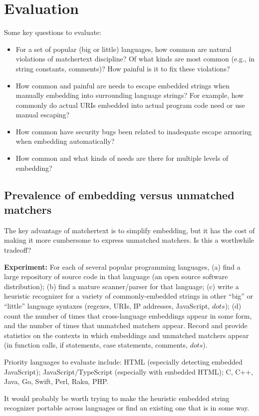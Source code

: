 \section{Evaluation}
\label{sec:eval}

Some key questions to evaluate:
\begin{itemize}
\item	For a set of popular (big or little) languages,
	how common are natural violations of matchertext discipline?
	Of what kinds are most common (e.g., in string constants, comments)?
	How painful is it to fix these violations?
\item	How common and painful are needs to escape embedded strings
	when manually embedding into surrounding language strings?
	For example, how commonly do actual URIs embedded into
	actual program code need or use manual escaping?
\item	How common have security bugs been related to
	inadequate escape armoring when embedding automatically?
\item	How common and what kinds of needs are there for
	multiple levels of embedding?
\end{itemize}


\subsection{Prevalence of embedding versus unmatched matchers}

The key advantage of matchertext is to simplify embedding,
but it has the cost of making it more cumbersome
to express unmatched matchers.
Is this a worthwhile tradeoff?

\textbf{Experiment:}
For each of several popular programming languages,
(a) find a large repository of source code in that language
(\eg an open source software distribution);
(b) find a mature scanner/parser for that language;
(c) write a heuristic recognizer for a variety
of commonly-embedded strings in other ``big'' or ``little'' language syntaxes
(\eg regexes, URIs, IP addresses, JavaScript, $dots$);
(d) count the number of times that cross-language embeddings
appear in some form,
and the number of times that unmatched matchers appear.
Record and provide statistics on the contexts in which embeddings
and unmatched matchers appear
(\eg in function calls, if statements, case statements, comments, $dots$).

Priority languages to evaluate include:
HTML (especially detecting embedded JavaScript);
JavaScript/TypeScript (especially with embedded HTML);
C, C++, Java, Go, Swift, Perl, Raku, PHP.

It would probably be worth trying to
make the heuristic embedded string recognizer portable across languages
or find an existing one that is in some way.

